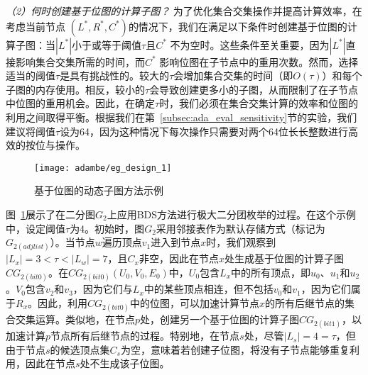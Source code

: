 \textit{（2）何时创建基于位图的计算子图？ }为了优化集合交集操作并提高计算效率，在考虑当前节点 $(L^*, R^*, C^*)$的情况下，我们在满足以下条件时创建基于位图的计算子图：当$|L^*|$小于或等于阈值$\tau$且$C^*$ 不为空时。这些条件至关重要，因为$|L^*|$直接影响集合交集所需的时间，而$C^*$ 影响位图在子节点中的重用次数。然而，选择适当的阈值$\tau$是具有挑战性的。较大的$\tau$会增加集合交集的时间（即$O(\tau)$）和每个子图的内存使用。相反，较小的$\tau$会导致创建更多小的子图，从而限制了在子节点中位图的重用机会。因此，在确定$\tau$时，我们必须在集合交集计算的效率和位图的利用之间取得平衡。根据我们在第~\ref{subsec:ada_eval_sensitivity}节的实验，我们建议将阈值$\tau$设为64，因为这种情况下每次操作只需要对两个64位长长整数进行高效的按位与操作。



\begin{figure} [H]
	\centering
	\texttt{[image: adambe/eg\_design\_1]}
	\caption{基于位图的动态子图方法示例}

	\label{fig:ada_design1}
\end{figure}



\begin{example}
	
	图~\ref{fig:ada_design1}展示了在二分图$G_2$上应用BDS方法进行极大二分团枚举的过程。在这个示例中，设定阈值$\tau$为4。初始时，图$G_2$采用邻接表作为默认存储方式（标记为$G_{2 (adjlist)}$）。当节点$w$遍历顶点$v_1$进入到节点$x$时，我们观察到$|L_x| = 3 < \tau < |L_w| = 7$，且$C_x$非空，因此在节点$x$处生成基于位图的计算子图$CG_{2 (bit0)}$。在$CG_{2 (bit0)}(U_0, V_0, E_0)$中，$U_0$包含$L_x$中的所有顶点，即$u_0$、$u_1$和$u_2$。$V_0$包含$v_2$和$v_3$，因为它们与$L_x$中的某些顶点相连，但不包括$v_0$和$v_1$，因为它们属于$R_x$。因此，利用$CG_{2 (bit0)}$中的位图，可以加速计算节点$x$的所有后继节点的集合交集运算。类似地，在节点$p$处，创建另一个基于位图的计算子图$CG_{2 (bit1)}$，以加速计算$p$节点所有后继节点的过程。特别地，在节点$s$处，尽管$|L_s| = 4 = \tau$，但由于节点$s$的候选顶点集$C_s$为空，意味着若创建子位图，将没有子节点能够重复利用，因此在节点$s$处不生成该子位图。
  
\end{example}

